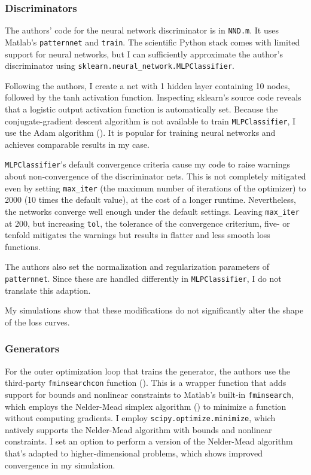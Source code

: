 \subsubsection{Discriminators}

The authors' code for the neural network discriminator is in \texttt{NND.m}.
It uses Matlab's \texttt{patternnet} and \texttt{train}.
The scientific Python stack comes with limited support for neural networks, but I can sufficiently approximate the author's discriminator using \texttt{sklearn.neural\_network.MLPClassifier}.

Following the authors, I create a net with 1 hidden layer containing 10 nodes, followed by the tanh activation function.
Inspecting sklearn's source code reveals that a logistic output activation function is automatically set. %
Because the conjugate-gradient descent algorithm is not available to train \texttt{MLPClassifier}, I use the Adam algorithm (\textcite{diederik2014adam}).
It is popular for training neural networks and achieves comparable results in my case. %

\texttt{MLPClassifier}'s default convergence criteria cause my code to raise warnings about non-convergence of the discriminator nets.
This is not completely mitigated even by setting \texttt{max\_iter} (the maximum number of iterations of the optimizer) to 2000 (10 times the default value), at the cost of a longer runtime. %
Nevertheless, the networks converge well enough under the default settings. %
Leaving \texttt{max\_iter} at 200, but increasing \texttt{tol}, the tolerance of the convergence criterium, five- or tenfold mitigates the warnings but results in flatter and less smooth loss functions. %

The authors also set the normalization and regularization parameters of \texttt{patternnet}.
Since these are handled differently in \texttt{MLPClassifier}, I do not translate this adaption.

My simulations show that these modifications do not significantly alter the shape of the loss curves. %

\subsubsection{Generators}

For the outer optimization loop that trains the generator, the authors use the third-party \texttt{fminsearchcon} function (\textcite{DErrico2024}).
This is a wrapper function that adds support for bounds and nonlinear constraints to Matlab's built-in \texttt{fminsearch}, which employs the Nelder-Mead simplex algorithm (\textcite{lagarias1998convergence}) to minimize a function without computing gradients.
I employ \texttt{scipy.optimize.minimize}, which natively supports the Nelder-Mead algorithm with bounds and nonlinear constraints.
I set an option to perform a version of the Nelder-Mead algorithm that's adapted to higher-dimensional problems, which shows improved convergence in my simulation. %

